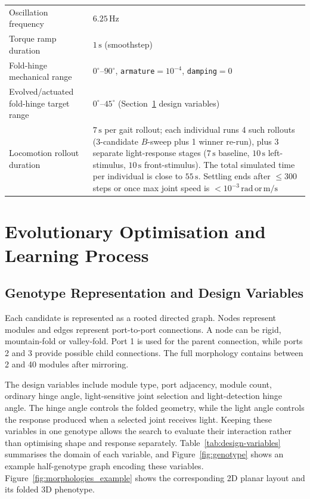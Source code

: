 \documentclass[12pt,a4paper]{report}
\begin{document}
\begin{table}[htbp]
\begin{tabular}{@{}p{6.6cm}p{8.4cm}@{}}
Oscillation frequency & $6.25\,\mathrm{Hz}$ \\
Torque ramp duration & $1\,\mathrm{s}$ (smoothstep) \\
Fold-hinge mechanical range & $0^\circ$--$90^\circ$, \texttt{armature}$=10^{-4}$, \texttt{damping}$=0$ \\
Evolved/actuated fold-hinge target range & $0^\circ$--$45^\circ$ (Section~\ref{sec:evo-learning} design variables) \\
Locomotion rollout duration & $7\,\mathrm{s}$ per gait rollout; each individual runs 4 such rollouts (3-candidate $B$-sweep plus 1 winner re-run), plus 3 separate light-response stages ($7\,\mathrm{s}$ baseline, $10\,\mathrm{s}$ left-stimulus, $10\,\mathrm{s}$ front-stimulus). The total simulated time per individual is close to $55\,\mathrm{s}$. Settling ends after $\le 300$ steps or once max joint speed is $<10^{-3}\,\mathrm{rad\,or\,m/s}$ \\
\bottomrule
\end{tabular}
\end{table}

\section{Evolutionary Optimisation and Learning Process}
\label{sec:evo-learning}

\subsection{Genotype Representation and Design Variables}
Each candidate is represented as a rooted directed graph. Nodes represent modules and edges represent port-to-port connections. A node can be rigid, mountain-fold or valley-fold. Port 1 is used for the parent connection, while ports 2 and 3 provide possible child connections. The full morphology contains between 2 and 40 modules after mirroring.

The design variables include module type, port adjacency, module count, ordinary hinge angle, light-sensitive joint selection and light-detection hinge angle. The hinge angle controls the folded geometry, while the light angle controls the response produced when a selected joint receives light. Keeping these variables in one genotype allows the search to evaluate their interaction rather than optimising shape and response separately. Table~\ref{tab:design-variables} summarises the domain of each variable, and Figure~\ref{fig:genotype} shows an example half-genotype graph encoding these variables. Figure~\ref{fig:morphologies_example} shows the corresponding 2D planar layout and its folded 3D phenotype.
\end{document}
